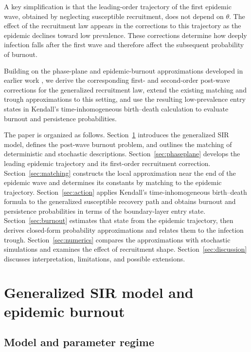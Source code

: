 \documentclass[11pt]{article}
\begin{document}
A key simplification is that the leading-order trajectory of the first epidemic wave, obtained by neglecting susceptible recruitment, does not depend on \(\theta\). The effect of the recruitment law appears in the corrections to this trajectory as the epidemic declines toward low prevalence. These corrections determine how deeply infection falls after the first wave and therefore affect the subsequent probability of burnout.

Building on the phase-plane and epidemic-burnout approximations developed in earlier work \cite{ParsonsEarn2024,ParsonsEtAl2024}, we derive the corresponding first- and second-order post-wave corrections for the generalized recruitment law, extend the existing matching and trough approximations to this setting, and use the resulting low-prevalence entry states in Kendall's time-inhomogeneous birth--death calculation to evaluate burnout and persistence probabilities.

The paper is organized as follows. Section~\ref{sec:model} introduces the generalized SIR model, defines the post-wave burnout problem, and outlines the matching of deterministic and stochastic descriptions. Section~\ref{sec:phaseplane} develops the leading epidemic trajectory and its first-order recruitment correction. Section~\ref{sec:matching} constructs the local approximation near the end of the epidemic wave and determines its constants by matching to the epidemic trajectory. Section~\ref{sec:action} applies Kendall's time-inhomogeneous birth--death formula to the generalized susceptible recovery path and obtains burnout and persistence probabilities in terms of the boundary-layer entry state. Section~\ref{sec:burnout} estimates that state from the epidemic trajectory, then derives closed-form probability approximations and relates them to the infection trough. Section~\ref{sec:numerics} compares the approximations with stochastic simulations and examines the effect of recruitment shape. Section~\ref{sec:discussion} discusses interpretation, limitations, and possible extensions.

\section{Generalized SIR model and epidemic burnout}
\label{sec:model}
\subsection{Model and parameter regime}
\end{document}

